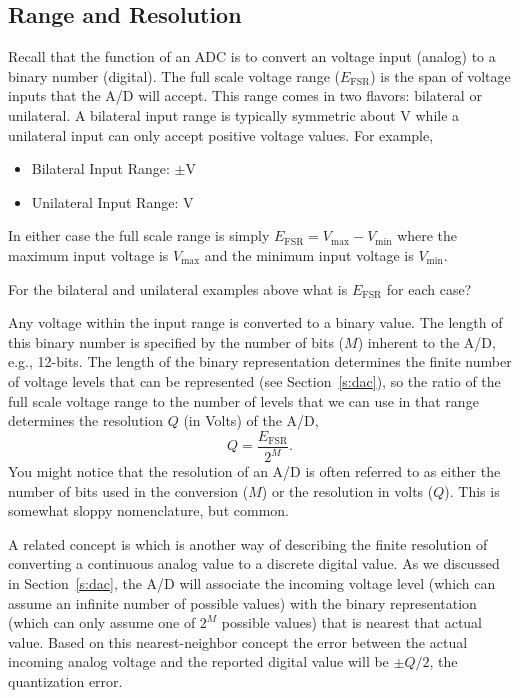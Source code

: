 \subsection{Range and Resolution}
Recall that the function of an ADC is to convert an voltage input (analog) to a binary number (digital).  The \gls{full scale voltage range} ($E_{\mathrm{FSR}}$) is the span of voltage inputs that the A/D will accept.  This range comes in two flavors: bilateral or unilateral.  A bilateral input range is typically symmetric about \unit[0]{V} while a unilateral input can only accept positive voltage values.  For example,
\begin{itemize}
\item Bilateral Input Range: $\pm$\unit[10]{V}
\item Unilateral Input Range: \unit[0--10]{V}
\end{itemize}
In either case the full scale range is simply $E_{\mathrm{FSR}}=V_{\mathrm{max}}-V_{\mathrm{min}}$ where the maximum input voltage is $V_{\mathrm{max}}$ and the minimum input voltage is $V_{\mathrm{min}}$.  
\begin{ex}
For the bilateral and unilateral examples above what is $E_{\mathrm{FSR}}$ for each case?
\end{ex}

Any voltage within the input range is converted to a binary value.  The length of this binary number is specified by the number of bits ($M$) inherent to the A/D, e.g., 12-bits.  The length of the binary representation determines the finite number of voltage levels that can be represented (see Section~\ref{s:dac}), so the ratio of the full scale voltage range to the number of levels that we can use in that range determines the resolution $Q$ (in Volts) of the A/D,
\begin{equation}
\label{e:q}
Q = \frac{E_{\mathrm{FSR}}}{2^M}.
\end{equation}
You might notice that the resolution of an A/D is often referred to as either the number of bits used in the conversion ($M$) or the resolution in volts ($Q$).  This is somewhat sloppy nomenclature, but common. 

A related concept is  which is another way of describing the finite resolution of converting a continuous analog value to a discrete digital value.  As we discussed in Section~\ref{s:dac}, the A/D will associate the incoming voltage level (which can assume an infinite number of possible values) with the binary representation (which can only assume one of $2^M$ possible values) that is nearest that actual value.  Based on this nearest-neighbor concept the error between the actual incoming analog voltage and the reported digital value will be $\pm Q/2$, the quantization error.


